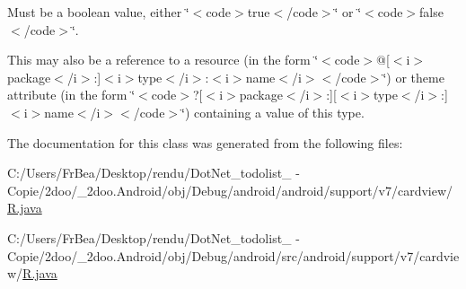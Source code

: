 Must be a boolean value, either \char`\"{}$<$code$>$true$<$/code$>$\char`\"{} or \char`\"{}$<$code$>$false$<$/code$>$\char`\"{}. 

This may also be a reference to a resource (in the form \char`\"{}$<$code$>$@\mbox{[}$<$i$>$package$<$/i$>$:\mbox{]}$<$i$>$type$<$/i$>$:$<$i$>$name$<$/i$>$$<$/code$>$\char`\"{}) or theme attribute (in the form \char`\"{}$<$code$>$?\mbox{[}$<$i$>$package$<$/i$>$:\mbox{]}\mbox{[}$<$i$>$type$<$/i$>$:\mbox{]}$<$i$>$name$<$/i$>$$<$/code$>$\char`\"{}) containing a value of this type. 

The documentation for this class was generated from the following files:\begin{CompactItemize}
\item 
C:/Users/FrBea/Desktop/rendu/DotNet\_\-todolist\_ - Copie/2doo/\_\-2doo.Android/obj/Debug/android/android/support/v7/cardview/\hyperlink{android_2support_2v7_2cardview_2_r_8java}{R.java}\item 
C:/Users/FrBea/Desktop/rendu/DotNet\_\-todolist\_ - Copie/2doo/\_\-2doo.Android/obj/Debug/android/src/android/support/v7/cardview/\hyperlink{src_2android_2support_2v7_2cardview_2_r_8java}{R.java}\end{CompactItemize}
